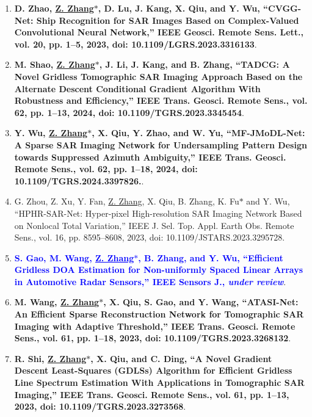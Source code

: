 \documentclass[paper=a4,fontsize=11pt]{scrartcl}
\begin{document}
\begin{enumerate}

\item \textbf{D. Zhao, \underline{Z. Zhang$\ast$}, D. Lu, J. Kang, X. Qiu, and Y. Wu, ``CVGG-Net: Ship Recognition for SAR Images Based on Complex-Valued Convolutional Neural Network,'' IEEE Geosci. Remote Sens. Lett., vol. 20, pp. 1–5, 2023, doi: 10.1109/LGRS.2023.3316133}.​
	
\item \textbf{M. Shao, \underline{Z. Zhang$\ast$}, J. Li, J. Kang, and B. Zhang, ``TADCG: A Novel Gridless Tomographic SAR Imaging Approach Based on the Alternate Descent Conditional Gradient Algorithm With Robustness and Efficiency,'' IEEE Trans. Geosci. Remote Sens., vol. 62, pp. 1–13, 2024, doi: 10.1109/TGRS.2023.3345454}.
	
\item \textbf{Y. Wu, \underline{Z. Zhang$\ast$}, X. Qiu, Y. Zhao, and W. Yu, ``MF-JMoDL-Net: A Sparse SAR Imaging Network for Undersampling Pattern Design towards Suppressed Azimuth Ambiguity,'' IEEE Trans. Geosci. Remote Sens., vol. 62, pp. 1–18, 2024, doi: 10.1109/TGRS.2024.3397826.}.

\item G. Zhou, Z. Xu, Y. Fan, \underline{Z. Zhang}, X. Qiu, B. Zhang, K. Fu$\ast$ and Y. Wu, ``HPHR-SAR-Net: Hyper-pixel High-resolution SAR Imaging Network Based on Nonlocal Total Variation,'' IEEE J. Sel. Top. Appl. Earth Obs. Remote Sens., vol. 16, pp. 8595–8608, 2023, doi: 10.1109/JSTARS.2023.3295728.

\item \textcolor{blue}{\textbf{S. Gao, M. Wang, \underline{Z. Zhang$\ast$}, B. Zhang, and Y. Wu, ``Efficient Gridless DOA Estimation for Non-uniformly Spaced Linear Arrays in Automotive Radar Sensors,'' IEEE Sensors J., \emph{under review}}}.

\item \textbf{M. Wang, \underline{Z. Zhang$\ast$}, X. Qiu, S. Gao, and Y. Wang, ``ATASI-Net: An Efficient Sparse Reconstruction Network for Tomographic SAR Imaging with Adaptive Threshold,'' IEEE Trans. Geosci. Remote Sens., vol. 61, pp. 1–18, 2023, doi: 10.1109/TGRS.2023.3268132}.	
	
\item \textbf{R. Shi, \underline{Z. Zhang$\ast$}, X. Qiu, and C. Ding, ``A Novel Gradient Descent Least-Squares (GDLSs) Algorithm for Efficient Gridless Line Spectrum Estimation With Applications in Tomographic SAR Imaging,'' IEEE Trans. Geosci. Remote Sens., vol. 61, pp. 1–13, 2023, doi: 10.1109/TGRS.2023.3273568}.


\end{enumerate}
\end{document}
